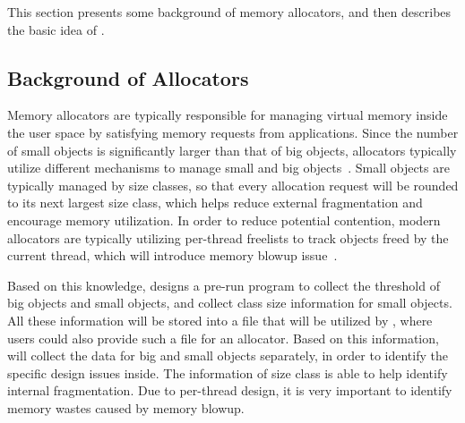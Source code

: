 This section presents some background of memory allocators, and then describes the basic idea of \MP{}. 

\subsection{Background of Allocators}

\label{sec:allocator}
Memory allocators are typically responsible for managing virtual memory inside the user space by satisfying memory requests from applications. Since the number of small objects is significantly larger than that of big objects,  allocators typically utilize different mechanisms to manage small and big objects~\cite{Hoard}. Small objects are typically managed by size classes, so that every allocation request will be rounded to its next largest size class, which helps reduce external fragmentation and encourage memory utilization. In order to reduce potential contention, modern allocators are typically utilizing per-thread freelists to track objects freed by the current thread, which will introduce memory blowup issue~\cite{Hoard}.

Based on this knowledge, \MP{} designs a pre-run program to collect the threshold of big objects and small objects, and collect class size information for small objects. All these information will be stored into a file that will be utilized by \MP{}, where users could also provide such a file for an allocator. Based on this information, \MP{} will collect the data for big and small objects separately, in order to identify the specific design issues inside. The information of size class is able to help identify internal fragmentation. Due to per-thread design, it is very important to identify memory wastes caused by memory blowup. 

 


